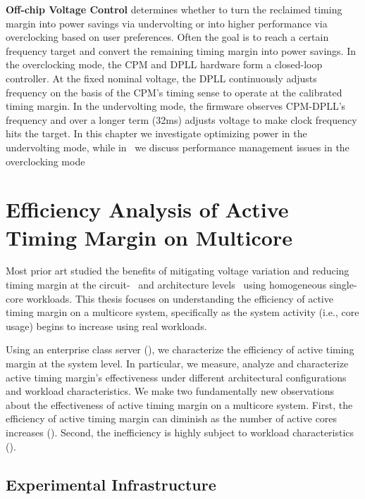 \textbf{Off-chip Voltage Control} determines whether to turn the reclaimed timing margin into power savings via undervolting or into higher performance via overclocking based on user preferences. Often the goal is to reach a certain frequency target and convert the remaining timing margin into power savings. In the overclocking mode, the CPM and DPLL hardware form a closed-loop controller. At the fixed nominal voltage, the DPLL continuously adjusts frequency on the basis of the CPM's timing sense to operate at the calibrated timing margin. In the undervolting mode, the firmware observes CPM-DPLL's frequency and over a longer term (32ms) adjusts voltage to make clock frequency hits the target. In this chapter we investigate optimizing power in the undervolting mode, while in~ we discuss performance management issues in the overclocking mode

\section{Efficiency Analysis of Active Timing Margin on Multicore}
\label{sec:voltage:characterization}

Most prior art studied the benefits of mitigating voltage variation and reducing timing margin at the circuit-~\cite{kurd2008next,bowman201222nm,grenat20145,tokunaga20145,bowman20158} and architecture levels~\cite{lefurgy2011active,reddi2009voltage,gupta2008decor,powell2003pipeline,reddi2010voltage,bertran2014voltage} using homogeneous single-core workloads. This thesis focuses on understanding the efficiency of active timing margin on a multicore system, specifically as the system activity (i.e., core usage) begins to increase using real workloads.

Using an enterprise class server (), we characterize the efficiency of active timing margin at the system level. In particular, we measure, analyze and characterize active timing margin's effectiveness under different architectural configurations and workload characteristics. We make two fundamentally new observations about the effectiveness of active timing margin on a multicore system. First, the efficiency of active timing margin can diminish as the number of active cores increases (). Second, the inefficiency is highly subject to workload characteristics ().

\subsection{Experimental Infrastructure}
\label{sec:voltage:characterization:setup}
 

